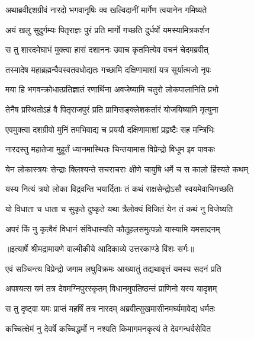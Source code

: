 \twolineshloka
{अथाब्रवीद्दशग्रीवं नारदो भगवानृषिः}
{क्व खल्विदानीं मार्गेण त्वयानेन गमिष्यते} %

\twolineshloka
{अयं खलु सुदुर्गम्यः पितृराज्ञः पुरं प्रति}
{मार्गो गच्छति दुर्धर्षो यमस्यामित्रकर्शन} %

\twolineshloka
{स तु शारदमेघाभं मुक्त्वा हासं दशाननः}
{उवाच कृतमित्येव वचनं चेदमब्रवीत्} %

\twolineshloka
{तस्मादेष महाब्रह्मन्वैवस्वतवधोद्यतः}
{गच्छामि दक्षिणामाशां यत्र सूर्यात्मजो नृपः} %

\twolineshloka
{मया हि भगवन्क्रोधात्प्रतिज्ञातं रणार्थिना}
{अवजेष्यामि चतुरो लोकपालानिति प्रभो} %

\twolineshloka
{तेनैष प्रस्थितोऽहं वै पितृराजपुरं प्रति}
{प्राणिसङ्क्लेशकर्तारं योजयिष्यामि मृत्युना} %

\twolineshloka
{एवमुक्त्वा दशग्रीवो मुनिं तमभिवाद्य च}
{प्रययौ दक्षिणामाशां प्रहृष्टैः सह मन्त्रिभिः} %

\twolineshloka
{नारदस्तु महातेजा मुहूर्तं ध्यानमास्थितः}
{चिन्तयामास विप्रेन्द्रो विधूम इव पावकः} %

\twolineshloka
{येन लोकास्त्रयः सेन्द्राः क्लिश्यन्ते सचराचराः}
{क्षीणे चायुषि धर्मे च स कालो हिंस्यते कथम्} %

\twolineshloka
{यस्य नित्यं त्रयो लोका विद्रवन्ति भयार्दिताः}
{तं कथं राक्षसेन्द्रोऽसौ स्वयमेवाभिगच्छति} %

\twolineshloka
{यो विधाता च धाता च सुकृते दुष्कृते यथा}
{त्रैलोक्यं विजितं येन तं कथं नु विजेष्यति} %

\twolineshloka
{अपरं किं नु कृत्वैवं विधानं संविधास्यति}
{कौतूहलसमुत्पन्नो यास्यामि यमसादनम्} %


{॥इत्यार्षे श्रीमद्रामायणे वाल्मीकीये आदिकाव्ये उत्तरकाण्डे विंशः सर्गः॥}


\twolineshloka
{एवं सञ्चिन्त्य विप्रेन्द्रो जगाम लघुविक्रमः}
{आख्यातुं तद्यथावृत्तं यमस्य सदनं प्रति} %

\twolineshloka
{अपश्यत्स यमं तत्र देवमग्निपुरस्कृतम्}
{विधानमुपतिष्ठन्तं प्राणिनो यस्य यादृशम्} %

\twolineshloka
{स तु दृष्ट्वा यमः प्राप्तं महर्षिं तत्र नारदम्}
{अब्रवीत्सुखमासीनमर्घ्यमावेद्य धर्मतः} %

\twolineshloka
{कच्चित्क्षेमं नु देवर्षे कच्चिद्धर्मो न नश्यति}
{किमागमनकृत्यं ते देवगन्धर्वसेवित} %

